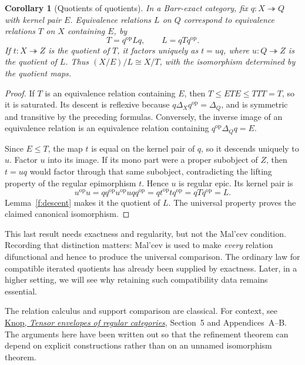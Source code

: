\documentclass[11pt]{article}
\newtheorem{corollary}[theorem]{Corollary}
\theoremstyle{definition}
\theoremstyle{remark}\newtheorem{remark}[theorem]{Remark}
\begin{document}
\begin{corollary}[Quotients of quotients]\label{d:iterated-quotient}
In a Barr-exact category, fix $q:X\twoheadrightarrow Q$ with kernel
pair $E$. Equivalence relations $L$ on $Q$ correspond to equivalence
relations $T$ on $X$ containing $E$, by
\[
T=q^{\mathrm{op}}Lq,\qquad L=qTq^{\mathrm{op}}.
\]
If $t:X\twoheadrightarrow Z$ is the quotient of $T$, it factors
uniquely as $t=uq$, where $u:Q\twoheadrightarrow Z$ is the quotient
of $L$. Thus $(X/E)/L\cong X/T$, with the isomorphism determined by
the quotient maps.
\end{corollary}
\begin{proof}
If $T$ is an equivalence relation containing $E$, then
$T\leq ETE\leq TTT=T$, so it is saturated. Its descent is reflexive
because $q\Delta_Xq^{\mathrm{op}}=\Delta_Q$, and is symmetric and
transitive by the preceding formulas. Conversely, the inverse image
of an equivalence relation is an equivalence relation containing
$q^{\mathrm{op}}\Delta_Qq=E$.

Since $E\leq T$, the map $t$ is equal on the kernel pair of $q$,
so it descends uniquely to $u$. Factor $u$ into its image. If its mono
part were a proper subobject of $Z$, then $t=uq$ would factor through
that same subobject, contradicting the lifting property of the regular
epimorphism $t$. Hence $u$ is regular epic. Its kernel pair is
\[
u^{\mathrm{op}}u
=qq^{\mathrm{op}}u^{\mathrm{op}}uqq^{\mathrm{op}}
=qt^{\mathrm{op}}tq^{\mathrm{op}}=qTq^{\mathrm{op}}=L.
\]
Lemma~\ref{f:descent} makes it the quotient of $L$. The universal
property proves the claimed canonical isomorphism.
\end{proof}

This last result needs exactness and regularity, but not the Mal'cev
condition. Recording that distinction matters: Mal'cev is used to make
\emph{every} relation difunctional and hence to produce the universal
comparison. The ordinary law for compatible iterated quotients has
already been supplied by exactness. Later, in a higher setting, we
will see why retaining such compatibility data remains essential.

The relation calculus and support comparison are classical. For
context, see \href{https://arxiv.org/pdf/math/0610552}{Knop,
\emph{Tensor envelopes of regular categories}}, Section~5 and
Appendices~A--B. The arguments here have been written out so that the
refinement theorem can depend on explicit constructions rather than on
an unnamed isomorphism theorem.

\end{document}
